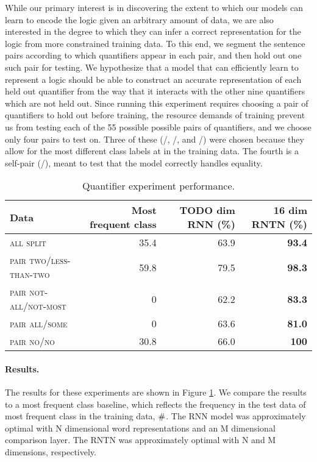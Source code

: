 While our primary interest is in discovering the extent to which our
models can learn to encode the logic given an arbitrary amount of
data, we are also interested in the degree to which they can infer a
correct representation for the logic from more constrained training
data. To this end, we segment the sentence pairs according to which
quantifiers appear in each pair, and then hold out one such pair for
testing. We hypothesize that a model that can efficiently learn to
represent a logic should be able to construct an accurate
representation of each held out quantifier from the way that it
interacts with the other nine quantifiers which are not held
out. Since running this experiment requires choosing a pair of
quantifiers to hold out before training, the resource demands of
training prevent us from testing each of the 55 possible possible
pairs of quantifiers, and we choose only four pairs to test on.  Three
of these (/, /, and
/) were chosen because they allow for the most
different class labels at in the training data. The fourth is a
self-pair (/), meant to test that the model correctly
handles equality.

\begin{table}[htp]
  \centering
  \begin{tabular}{ l rrr }
    \toprule
    Data & Most frequent class & TODO dim RNN (\%) & 16 dim RNTN (\%)\\
    \midrule
    \textsc{all split}	& 35.4 &	63.9&	\textbf{93.4}
    \\[1ex]    
    \textsc{pair two/less-than-two}	& 59.8 &	79.5 &	\textbf{98.3} \\
    \textsc{pair not-all/not-most}	&0 &	   62.2  &	\textbf{83.3} \\
    \textsc{pair all/some}	& 0& 63.6  &	\textbf{81.0} \\
    \textsc{pair no/no}	& 30.8 &	66.0 &	\textbf{100} \\
    \bottomrule
  \end{tabular}
  \caption{Quantifier experiment performance. }
  \label{resultstable}
\end{table} 


\paragraph{Results.} The results for these experiments are shown in Figure \ref{resultstable}. We compare the results to a most frequent class baseline, which reflects the frequency in the test data of most frequent class in the training data, $\mathbin{\#}$.
The RNN model was approximately optimal with N dimensional word representations and an M dimensional comparison layer. The RNTN was approximately optimal with N and M dimensions, respectively.

